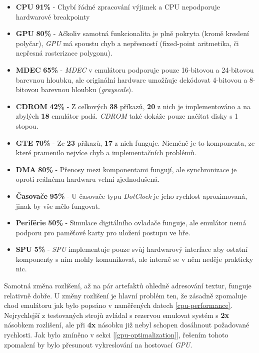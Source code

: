 \begin{itemize}
    \item{\textbf{CPU} \textbf{91\%} - Chybí řádné zpracování výjimek a CPU nepodporuje hardwarové breakpointy}
    \item{\textbf{GPU} \textbf{80\%} - Ačkoliv samotná funkcionalita je plně pokryta (kromě kreslení polyčar), \textit{GPU} má spoustu chyb a nepřesností (fixed-point aritmetika, či nepřesná rasterizace polygonu).}
    \item{\textbf{MDEC} \textbf{65\%} - \textit{MDEC} v emulátoru podporuje pouze 16-bitovou a 24-bitovou barevnou hloubku, ale originální hardware umožňuje dekódovat 4-bitovou a 8-bitovou barevnou hloubku (\textit{grayscale}).}
    \item{\textbf{CDROM} \textbf{42\%} - Z celkových \textbf{38} příkazů, \textbf{20} z nich je implementováno a na zbylých \textbf{18} emulátor padá. \textit{CDROM} také dokáže pouze načítat disky s 1 stopou.}
    \item{\textbf{GTE} \textbf{70\%} - Ze \textbf{23} příkazů, \textbf{17} z nich funguje. Nicméně je to komponenta, ze které pramenilo nejvíce chyb a implementačních problémů.}
    \item{\textbf{DMA} \textbf{80\%} - Přenosy mezi komponentami fungují, ale synchronizace je oproti reálnému hardwaru velmi zjednodušená.}
    \item{\textbf{Časovače} \textbf{95\%} - U časovače typu \textit{DotClock} je jeho rychlost aproximovaná, jinak by vše mělo fungovat.}
    \item{\textbf{Periférie} \textbf{50\%} - Simulace digitálního ovladače funguje, ale emulátor nemá podporu pro paměťové karty pro uložení postupu ve hře.}
    \item{\textbf{SPU} \textbf{5\%} - \textit{SPU} implementuje pouze svůj hardwarový interface aby ostatní komponenty s ním mohly komunikovat, ale interně se v něm neděje prakticky nic.}
\end{itemize}

Samotná změna rozlišení, až na pár artefaktů ohledně adresování textur, funguje relativně dobře. U změny rozlišení je hlavní problém ten, že zásadně zpomaluje chod emulátoru jak bylo popsáno v naměřených datech \ref{cpu-performance}. Nejrychlejší z testovaných strojů zvládal s rezervou emulovat systém s \textbf{2x} násobkem rozlišení, ale při \textbf{4x} násobku již nebyl schopen dosáhnout požadované rychlosti. Jak bylo zmíněno v sekci [\ref{gpu-optimalization}], řešením tohoto zpomalení by bylo přesunout vykreslování na hostovací \textit{GPU}.